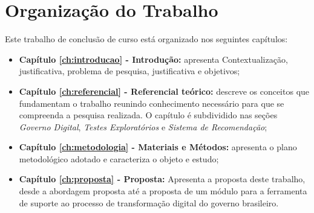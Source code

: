 \section{Organização do Trabalho}

Este trabalho de conclusão de curso está organizado nos seguintes capítulos:

\begin{itemize}
    \item \textbf{Capítulo \ref{ch:introducao} - Introdução:} apresenta Contextualização, justificativa, problema de pesquisa, justificativa e objetivos;
    \item \textbf{Capítulo \ref{ch:referencial} - Referencial teórico:} descreve os conceitos que fundamentam o trabalho reunindo conhecimento necessário para que se compreenda a pesquisa realizada. O capítulo é subdividido nas seções \textit{Governo Digital}, \textit{Testes Exploratórios} e \textit{Sistema de Recomendação};
     \item \textbf{Capítulo \ref{ch:metodologia} - Materiais e Métodos:} apresenta o plano metodológico adotado e caracteriza o objeto e estudo;
     \item \textbf{Capítulo \ref{ch:proposta} - Proposta:} Apresenta a proposta deste trabalho, desde a abordagem proposta até a proposta de um módulo para a ferramenta de suporte ao processo de transformação digital do governo brasileiro.
     
    
\end{itemize}